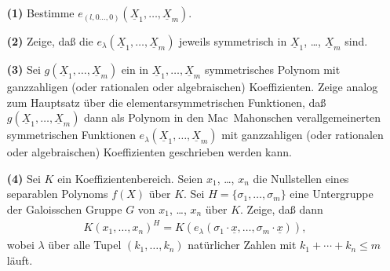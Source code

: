 \documentclass[a4paper,10pt]{algsheet}
\begin{document}
\begin{exercise}
\begin{itemize}
 \item [\textbf{(1)}] Bestimme 
    $e_{(l,0 \dotsc, 0)}(\underline X_1, \dotsc, \underline X_m)$. 
\item [\textbf{(2)}]  Zeige, daß
    die \(e_\lambda(\underline X_1, \dotsc, \underline X_m)\)
    jeweils symmetrisch in \(\underline X_1\), \dots, \(\underline X_m\) sind.
\item [\textbf{(3)}]
   Sei \(g(\underline X_1, \dotsc, \underline X_m)\) ein in \(\underline X_1,
    \dotsc, \underline X_m\) symmetrisches Polynom mit ganzzahligen (oder rationalen
    oder algebraischen) Koeffizienten. Zeige analog zum Hauptsatz über die
    elementarsymmetrischen Funktionen, daß \(g(\underline X_1, \dotsc, \underline
    X_m)\) dann als Polynom in den Mac~Mahonschen verallgemeinerten symmetrischen
    Funktionen \newline 
    \(e_\lambda(\underline X_1, \dotsc, \underline X_m)\) mit ganzzahligen
    (oder rationalen oder algebraischen) Koeffizienten geschrieben werden kann.
\item [\textbf{(4)}] 
    Sei \(K\) ein Koeffizientenbereich.
    Seien \(x_1\), \dots, \(x_n\) die Nullstellen eines separablen Polynoms \(f(X)\)
    über \(K\). Sei \(H = \{\sigma_1, \dots, \sigma_m\}\) eine
    Untergruppe der Galoisschen Gruppe \(G\) von \(x_1\), \dots, \(x_n\) über \(K\).
    Zeige, daß dann
    \begin{align*}
        K(x_1, \dotsc, x_n)^H =
        K(e_\lambda(\sigma_1 \cdot \underline x, \dotsc, \sigma_m \cdot \underline x)),
    \end{align*}
    wobei \(\lambda\) über alle Tupel \((k_1, \dotsc, k_n)\) natürlicher Zahlen
    mit \(k_1 + \dotsb + k_n \leq m\) läuft.
\end{itemize}
\end{exercise}
\end{document}
